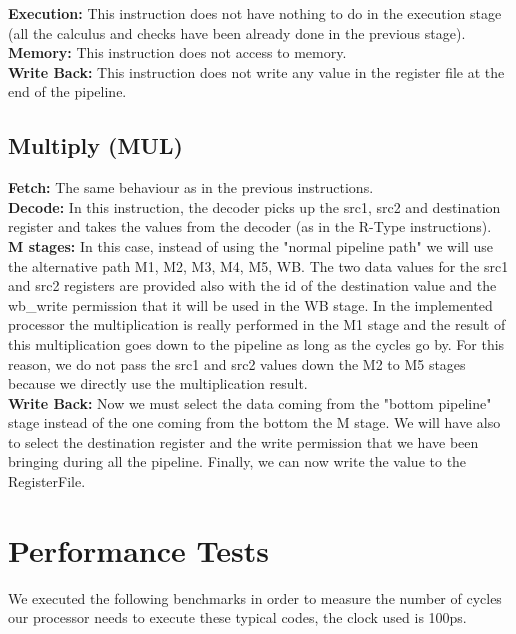 \documentclass{article}
\begin{document}
\textbf{Execution:} This instruction does not have nothing to do in the execution stage (all the calculus and checks have been already done in the previous stage).\\

\textbf{Memory:} This instruction does not access to memory.\\

\textbf{Write Back:} This instruction does not write any value in the register file at the end of the pipeline.\\

\newpage
\subsection{Multiply (MUL)}

\textbf{Fetch:} The same behaviour as in the previous instructions.\\

\textbf{Decode:} In this instruction, the decoder picks up the src1, src2 and destination register and takes the values from the decoder (as in the R-Type instructions).\\

\textbf{M stages:} In this case, instead of using the "normal pipeline path" we will use the alternative path M1, M2, M3, M4, M5, WB. The two data values for the src1 and src2 registers are provided also with the id of the destination value and the wb\_write permission that it will be used in the WB stage. In the implemented processor the multiplication is really performed in the M1 stage and the result of this multiplication goes down to the pipeline as long as the cycles go by. For this reason, we do not pass the src1 and src2 values down the M2 to M5 stages because we directly use the multiplication result.\\

\textbf{Write Back:} Now we must select the data coming from the "bottom pipeline" stage instead of the one coming from the bottom the M stage. We will have also to select the destination register and the write permission that we have been bringing during all the pipeline. Finally, we can now write the value to the RegisterFile.\\

\vspace{5pt}

\newpage
\section{Performance Tests}
We executed the following benchmarks in order to measure the number of cycles our processor needs to execute these typical codes, the clock used is 100ps.
\end{document}
